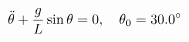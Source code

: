 \documentclass[preview]{standalone}
\begin{document}
\begin{align*}
\special{dvisvgm:raw <g id='unique000'>}\ddot{\theta} + \frac{g}{L}\sin\theta = 0, \quad \theta_0 = 30.0^\circ\special{dvisvgm:raw </g>}
\end{align*}
\end{document}
